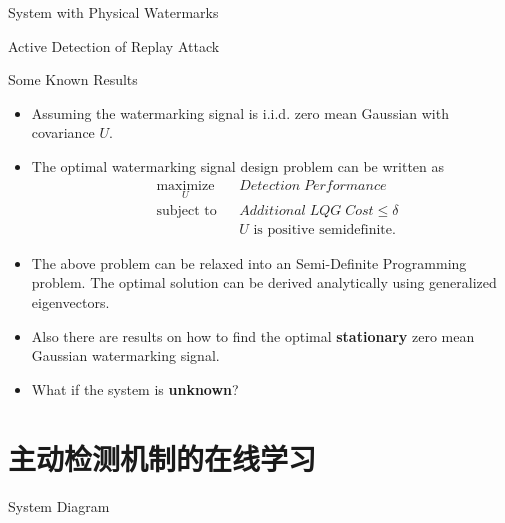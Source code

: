 \documentclass[10pt]{beamer}
\newlength\figureheight
\newlength\figurewidth
\newcommand{\tikzdir}[1]{#1.tikz}
\newcommand{\inputtikz}[1]{}}
\begin{document}
\begin{frame}{System with Physical Watermarks}
    \begin{figure}[htpb]
      \begin{center}
	\inputtikz{replaywithphywatermark}
      \end{center}
    \end{figure}
\end{frame}

\begin{frame}{Active Detection of Replay Attack}
  \setlength{\figureheight}{6cm}
  \setlength{\figurewidth}{7cm}
    \begin{figure}[htpb]
      \begin{center}
	\inputtikz{replay1}
      \end{center}
    \end{figure}
\end{frame}

\begin{frame}{Some Known Results}
  \begin{itemize}
  \item Assuming the watermarking signal is i.i.d. zero mean Gaussian with covariance $U$.
  \item The optimal watermarking signal design problem can be written as
    \begin{align*}
      &\mathop{\textrm{maximize}}\limits_{U}&
      & Detection\;Performance\\
      &\textrm{subject to}&
      & Additional\;LQG\;Cost \leq \delta \\
      &&& U \text{ is positive semidefinite.}
    \end{align*}
  \item The above problem can be relaxed into an Semi-Definite Programming problem. The optimal solution can be derived analytically using generalized eigenvectors.
  \item Also there are results on how to find the optimal \textbf{stationary} zero mean Gaussian watermarking signal.
  \item What if the system is \textbf{unknown}?
  \end{itemize}
\end{frame}

\section{主动检测机制的在线学习}

\begin{frame}{System Diagram}
  \begin{figure}[htpb]
    \inputtikz{systemdiagram2}
  \end{figure}
\end{frame}
\end{document}
